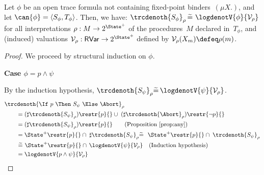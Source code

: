 \documentclass[a4paper,numberwithinsect]{lipics-v2021}
\begin{document}
\begin{lemma}
\label{lem:can-characterisation-rec}
  Let $\phi$ be an open trace formula not containing fixed-point 
  binders~$(\mu X.)$, and let
  $\can{\phi} = \langle S_\phi, T_\phi \rangle$.
  Then, we have:
  $ \trcdenoth{S_\phi}_\rho \,\widetilde{=}\ 
     \logdenotV{\phi}{\mathcal{V}_\rho} $
  for all interpretations $\rho : M \rightarrow 2^{\State^+}$
  of the procedures~$M$ declared in~$T_\phi$, and (induced) valuations 
  $\mathcal{V}_\rho : \mathsf{RVar} \rightarrow 2^{\State^+}$
  defined by
  $\mathcal{V}_\rho (X_m) \defeq \rho (m)$.
\end{lemma}

\begin{proof}%
  We proceed by structural induction on $\phi$.

  \noindent\textbf{Case $\phi = p \land \psi$}
  
  By the induction hypothesis,
  $\trcdenoth{S_\psi}_\rho \widetilde{=}\,
  \logdenotV{\psi}{\mathcal{V}_\rho}$.%
  \begin{align*}
    & \trcdenoth{\If\ p\ \Then\ S_\psi\ \Else\ \Abort}_\rho
      \\
    & \qquad = (\sharp\trcdenoth{S_\psi}_\rho)\restr{p}{}\cup\;(\sharp\trcdenoth{\Abort}_\rho)\restr{\neg p}{}\\
    & \qquad = (\sharp\trcdenoth{S_\psi}_\rho)\restr{p}{}\quad\quad
         \text{(Proposition~\ref{prop:any})}\\
    & \qquad = \State^+\restr{p}{}\cap\;\sharp\trcdenoth{S_\psi}_\rho \widetilde{=}\ \ \State^+\restr{p}{}\cap\;\trcdenoth{S_\psi}_\rho\\
    & \qquad \;\widetilde{=}\ \State^+\restr{p}{}\cap\,\logdenotV{\psi}{\mathcal{V}_\rho}\quad\text{(Induction hypothesis)}\\
    & \qquad = \logdenotV{p\land\psi}{\mathcal{V}_\rho}
  \end{align*}


\end{proof}
\end{document}
